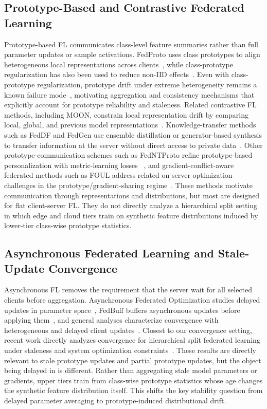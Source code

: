 \subsection{Prototype-Based and Contrastive Federated Learning}
Prototype-based FL communicates class-level feature summaries rather than full parameter updates or sample activations. FedProto uses class prototypes to align heterogeneous local representations across clients~\cite{tan2022fedproto}, while class-prototype regularization has also been used to reduce non-IID effects~\cite{dai2023tacklingFedProx}. Even with class-prototype regularization, prototype drift under extreme heterogeneity remains a known failure mode~\cite{bensiah2025feddpa,zhang2020personalized}, motivating aggregation and consistency mechanisms that explicitly account for prototype reliability and staleness. Related contrastive FL methods, including MOON, constrain local representation drift by comparing local, global, and previous model representations~\cite{9578660}. Knowledge-transfer methods such as FedDF and FedGen use ensemble distillation or generator-based synthesis to transfer information at the server without direct access to private data~\cite{lin2020ensemble,zhu2021data}. Other prototype-communication schemes such as FedNTProto refine prototype-based personalization with metric-learning losses ~\cite{10660707}, and gradient-conflict-aware federated methods such as FOUL address related on-server optimization challenges in the prototype/gradient-sharing regime~\cite{nguyen2026computation}. These methods motivate communication through representations and distributions, but most are designed for flat client-server FL. They do not directly analyze a hierarchical split setting in which edge and cloud tiers train on synthetic feature distributions induced by lower-tier class-wise prototype statistics.

\subsection{Asynchronous Federated Learning and Stale-Update Convergence}
Asynchronous FL removes the requirement that the server wait for all selected clients before aggregation. Asynchronous Federated Optimization studies delayed updates in parameter space~\cite{xie2019asynchronous}, FedBuff buffers asynchronous updates before applying them~\cite{nguyen2022federated}, and general analyses characterize convergence with heterogeneous and delayed client updates~\cite{fraboni2023general}. Closest to our convergence setting, recent work directly analyzes convergence for hierarchical split federated learning under staleness and system optimization constraints~\cite{10980018}. These results are directly relevant to stale prototype updates and partial prototype updates, but the object being delayed in \ehsfp is different. Rather than aggregating stale model parameters or gradients, upper tiers train from class-wise prototype statistics whose age changes the synthetic feature distribution itself. This shifts the key stability question from delayed parameter averaging to prototype-induced distributional drift.

